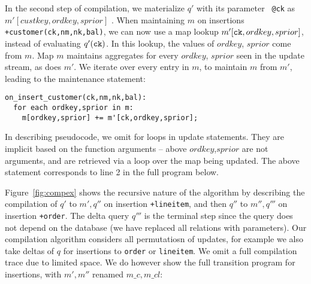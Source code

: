 In the second step of compilation, we materialize $q'$ with its parameter {\tt
@ck} as $m'[custkey,ordkey,sprior]$ . When maintaining $m$ on insertions {\tt
+customer(ck,nm,nk,bal)}, we can now use a map lookup $m'[\mbox{{\tt
ck}},ordkey,sprior]$, instead of evaluating $q'(\mbox{{\tt ck}})$. In this
lookup, the values of $ordkey$, $sprior$ come from $m$. Map $m$ maintains
aggregates for every $ordkey$, $sprior$ seen in the update stream, as does $m'$.
We iterate over every entry in $m$, to maintain $m$ from $m'$, leading to the
maintenance statement:

{\footnotesize
\begin{verbatim}
on_insert_customer(ck,nm,nk,bal):
  for each ordkey,sprior in m:
    m[ordkey,sprior] += m'[ck,ordkey,sprior];
\end{verbatim}
}

\noindent In describing pseudocode, we omit for loops in update statements.
They are implicit based on the function arguments -- above $ordkey$,$sprior$ are not
arguments, and are retrieved via a loop over the map being updated. The above
statement corresponds to line 2 in the full program below.

Figure~\ref{fig:compex} shows the recursive nature of the algorithm by
describing the compilation of $q'$ to $m',q''$ on insertion {\tt +lineitem},
and then $q''$ to $m'',q'''$ on insertion {\tt +order}. The delta query $q'''$
is the terminal step since the query does not depend on the database (we have
replaced all relations with parameters). Our compilation algorithm considers all
permutatiosn of updates, for example we also take deltas of $q$ for insertions
to {\tt order} or {\tt lineitem}. We omit a full compilation trace due to
limited space. We do however show the full transition program for insertions,
with $m',m''$ renamed $m\_c,m\_cl$:


